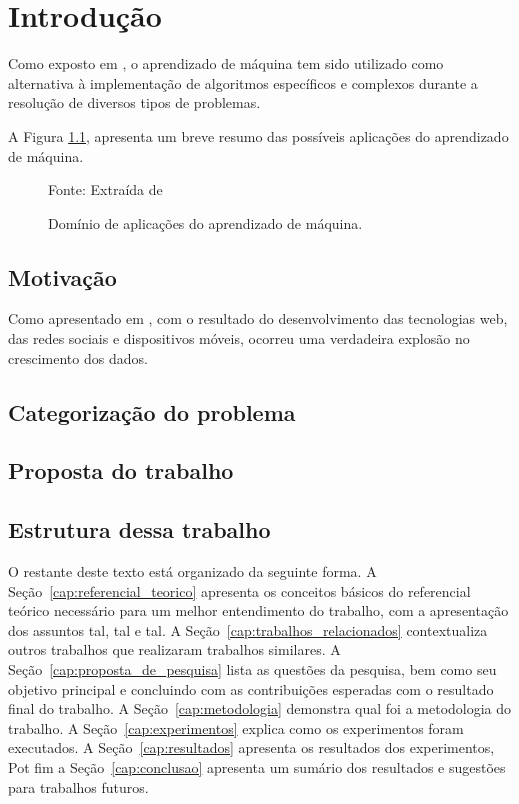 \chapter{Introdução}

Como exposto em \cite{Torralba2008}, o aprendizado de máquina tem sido utilizado como alternativa à implementação de algoritmos específicos e complexos durante a resolução de diversos tipos de problemas. 

\lipsum[6]

A Figura \ref{fig:mlapplications}, apresenta um breve resumo das possíveis aplicações do aprendizado de máquina.

\begin{figure}[ht]
    \centering
    \caption{Domínio de aplicações do aprendizado de máquina.}
            {Fonte: Extraída de \cite{ApplicationMachineLearning}}
    \label{fig:mlapplications}
\end{figure}

\lipsum[7-8]

\section{Motivação}

Como apresentado em \cite{MLBigdata}, com o resultado do desenvolvimento das tecnologias web, das redes sociais e dispositivos móveis, ocorreu uma verdadeira explosão no crescimento dos dados. 

\lipsum[9-16]


\section{Categorização do problema}

\lipsum[17-18]

\section{Proposta do trabalho}

\lipsum[19-21]

\section{Estrutura dessa trabalho}

O restante deste texto está organizado da seguinte forma. A Seção~\ref{cap:referencial_teorico} apresenta os conceitos básicos do referencial teórico necessário para um melhor entendimento do trabalho, com a apresentação dos assuntos tal, tal e tal. A Seção~\ref{cap:trabalhos_relacionados} contextualiza outros trabalhos que realizaram trabalhos similares. A Seção~\ref{cap:proposta_de_pesquisa} lista as questões da pesquisa, bem como seu objetivo principal e concluindo com as contribuições esperadas com o resultado final do trabalho. A Seção~\ref{cap:metodologia} demonstra qual foi a metodologia do trabalho. A Seção~\ref{cap:experimentos} explica como os experimentos foram executados. A Seção~\ref{cap:resultados} apresenta os resultados dos experimentos, Pot fim a Seção~\ref{cap:conclusao} apresenta um sumário dos resultados e sugestões para trabalhos futuros. 